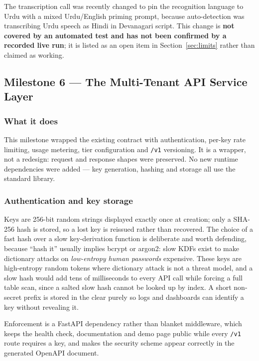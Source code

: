 \documentclass[11pt,a4paper]{article}
\newcommand{\code}[1]{\texttt{\small #1}}
\begin{document}
The transcription call was recently changed to pin the recognition language to
Urdu with a mixed Urdu/English priming prompt, because auto-detection was
transcribing Urdu speech as Hindi in Devanagari script. This change is
\textbf{not covered by an automated test and has not been confirmed by a
recorded live run}; it is listed as an open item in
Section~\ref{sec:limits} rather than claimed as working.

\subsection{Milestone 6 --- The Multi-Tenant API Service Layer}

\subsubsection*{What it does}

This milestone wrapped the existing contract with authentication, per-key rate
limiting, usage metering, tier configuration and \code{/v1} versioning. It is
a wrapper, not a redesign: request and response shapes were preserved. No new
runtime dependencies were added --- key generation, hashing and storage all use
the standard library.

\subsubsection*{Authentication and key storage}

Keys are 256-bit random strings displayed exactly once at creation; only a
SHA-256 hash is stored, so a lost key is reissued rather than recovered. The
choice of a fast hash over a slow key-derivation function is deliberate and
worth defending, because ``hash it'' usually implies bcrypt or argon2: slow
KDFs exist to make dictionary attacks on \emph{low-entropy human passwords}
expensive. These keys are high-entropy random tokens where dictionary attack
is not a threat model, and a slow hash would add tens of milliseconds to every
API call while forcing a full table scan, since a salted slow hash cannot be
looked up by index. A short non-secret prefix is stored in the clear purely so
logs and dashboards can identify a key without revealing it.

Enforcement is a FastAPI dependency rather than blanket middleware, which
keeps the health check, documentation and demo page public while every
\code{/v1} route requires a key, and makes the security scheme appear
correctly in the generated OpenAPI document.
\end{document}
